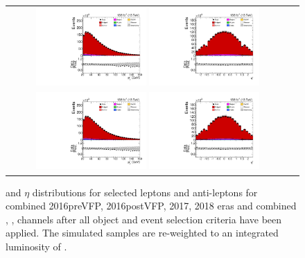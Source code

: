 \begin{figure}[htb]
    \begin{center}
        \begin{tabular}{cc}
            \includegraphics[width=0.40\textwidth]{fig_fullRun2UL/controlplots/combined/HypLeptonpT.pdf}
            \includegraphics[width=0.40\textwidth]{fig_fullRun2UL/controlplots/combined/HypLeptonEta.pdf} \\
            \includegraphics[width=0.40\textwidth]{fig_fullRun2UL/controlplots/combined/HypAntiLeptonpT.pdf}
            \includegraphics[width=0.40\textwidth]{fig_fullRun2UL/controlplots/combined/HypAntiLeptonEta.pdf}
        \end{tabular}
        \caption{\footnotesize \pT and $\eta$ distributions for selected leptons and anti-leptons for combined 2016preVFP, 2016postVFP, 2017, 2018 eras and combined \ee, \emu, \mumu channels after all object and event selection criteria have been applied.
        The simulated samples are re-weighted to an integrated luminosity of \lumivalueRuniiUL.
}
\end{center}
\end{figure}
